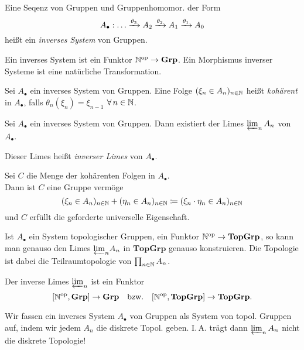 \documentclass{cheat-sheet}
\newcommand{\Grp}{\mathbf{Grp}} %
\newcommand{\TopGrp}{\mathbf{TopGrp}} %
\newcommand{\op}{\mathrm{op}} %
\begin{document}
\begin{defn}
  Eine Seqenz von Gruppen und Gruppenhomomor. der Form
  \[
    A_\bullet : \ldots \xrightarrow{\theta_3} A_2 \xrightarrow{\theta_2} A_1 \xrightarrow{\theta_1} A_0
  \]
  heißt ein \emph{inverses System} von Gruppen.
\end{defn}

\begin{bem}
  Ein inverses System ist ein Funktor $\N^\op \to \Grp$.
  Ein Morphismus inverser Systeme ist eine natürliche Transformation.
\end{bem}

\begin{defn}
  Sei $A_\bullet$ ein inverses System von Gruppen.
  Eine Folge $(\xi_n \in A_n)_{n \in \mathbb{N}}$ heißt \emph{kohärent} in $A_\bullet$, falls $\theta_n(\xi_n) = \xi_{n-1}$ $\forall \, n \in \mathbb{N}$.
\end{defn}

\begin{prop}
  Sei $A_\bullet$ ein inverses System von Gruppen.
  Dann existiert der Limes $\varprojlim_{n} A_n$ von $A_\bullet$.
\end{prop}

\begin{defn}
  Dieser Limes heißt \emph{inverser Limes} von $A_\bullet$.
\end{defn}

\begin{konstr}
  Sei $C$ die Menge der kohärenten Folgen in $A_\bullet$. \\
  Dann ist $C$ eine Gruppe vermöge
  \[
    (\xi_n \in A_n)_{n \in \mathbb{N}} + (\eta_n \in A_n)_{n \in \mathbb{N}} \coloneqq (\xi_n \cdot \eta_n \in A_n)_{n \in \mathbb{N}}
  \]
  und $C$ erfüllt die geforderte universelle Eigenschaft.
\end{konstr}

\begin{bem}
  Ist $A_\bullet$ ein System topologischer Gruppen, \dh{} ein Funktor $\N^\op \to \TopGrp$, so kann man genauso den Limes ${\varprojlim}_{n} A_n$ in $\TopGrp$ genauso konstruieren.
  Die Topologie ist dabei die Teilraumtopologie von $\prod_{n \in \N} A_n$.
\end{bem}

\begin{bem}
  Der inverse Limes ${\varprojlim}_n$ ist ein Funktor
  \[
    [\N^\op, \Grp] \to \Grp
    \quad \text{bzw.} \quad
    [\N^\op, \TopGrp] \to \TopGrp.
  \]
\end{bem}

\begin{acht}
  Wir fassen ein inverses System $A_\bullet$ von Gruppen als System von topol. Gruppen auf, indem wir jedem $A_n$ die diskrete Topol. geben.
  I.\,A. trägt dann $\varprojlim_{n} A_n$ nicht die diskrete Topologie!
\end{acht}
\end{document}
